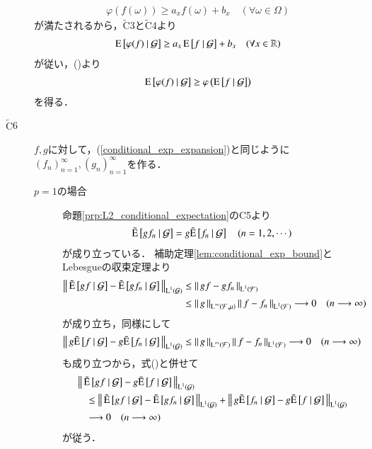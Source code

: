 \begin{prf}
\begin{description}
\begin{align}
					\varphi(f(\omega)) \geq a_x f(\omega) + b_x \quad (\forall \omega \in \Omega)
				\end{align}
				が満たされるから，$\tilde{\mathrm{C}}$3と$\tilde{\mathrm{C}}$4より
				\begin{align}
					\cexp{\varphi(f)}{\mathcal{G}} \geq a_x \cexp{f}{\mathcal{G}} + b_x \quad (\forall x \in \R)
				\end{align}
				が従い，()より
				\begin{align}
					\cexp{\varphi(f)}{\mathcal{G}} \geq \varphi\left( \cexp{f}{\mathcal{G}} \right)
				\end{align}
				を得る．
				
			\item[$\tilde{\mathrm{C}}$6]
				$f,g$に対して，(\ref{conditional_exp_expansion})と同じように$(f_n)_{n=1}^{\infty},(g_n)_{n=1}^{\infty}$を作る．
				\begin{description}
					\item[$p=1$の場合]
						命題\ref{prp:L2_conditional_expectation}のC5より
						\begin{align}
							\tcexp{gf_n}{\mathcal{G}} = g\tcexp{f_n}{\mathcal{G}}
							\quad (n=1,2,\cdots) \label{eq:conditional_exp_L1}
						\end{align}
						が成り立っている．
						補助定理\ref{lem:conditional_exp_bound}とLebesgueの収束定理より
						\begin{align}
							\Norm{\tcexp{gf}{\mathcal{G}} - \tcexp{gf_n}{\mathcal{G}}}{\Lp{1}{\mathcal{G}}}
							&\leq \Norm{gf - gf_n}{\Lp{1}{\mathcal{F}}} \\
							&\leq \Norm{g}{\Lp{\infty}{\mathcal{F},\mu}}\Norm{f - f_n}{\Lp{1}{\mathcal{F}}}
							\longrightarrow 0 \quad (n \longrightarrow \infty)
						\end{align}
						が成り立ち，同様にして
						\begin{align}
							\Norm{g\tcexp{f}{\mathcal{G}} - g\tcexp{f_n}{\mathcal{G}}}{\Lp{1}{\mathcal{G}}}
							\leq \Norm{g}{\Lp{\infty}{\mathcal{F}}} \Norm{f - f_n}{\Lp{1}{\mathcal{F}}}
							\longrightarrow 0 \quad (n \longrightarrow \infty)
						\end{align}
						も成り立つから，式()と併せて
						\begin{align}
							&\Norm{\tcexp{gf}{\mathcal{G}} - g\tcexp{f}{\mathcal{G}}}{\Lp{1}{\mathcal{G}}} \\
							&\quad \leq \Norm{\tcexp{gf}{\mathcal{G}} - \tcexp{gf_n}{\mathcal{G}}}{\Lp{1}{\mathcal{G}}}
								+ \Norm{g\tcexp{f_n}{\mathcal{G}} - g\tcexp{f}{\mathcal{G}}}{\Lp{1}{\mathcal{G}}} \\
							&\quad \longrightarrow 0 \quad (n \longrightarrow \infty)
						\end{align}
						が従う．
						

\end{description}
\end{description}
\end{prf}
